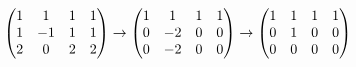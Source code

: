 \documentclass[preview]{standalone}
\begin{document}
\begin{align*}
\special{dvisvgm:raw <g id='unique000'>}\begin{pmatrix}1&1&1&1\\1&-1&1&1\\2&0&2&2\end{pmatrix}\to\begin{pmatrix}1&1&1&1\\0&-2&0&0\\0&-2&0&0\end{pmatrix}\to\begin{pmatrix}1&1&1&1\\0&1&0&0\\0&0&0&0\end{pmatrix}\special{dvisvgm:raw </g>}
\end{align*}
\end{document}
